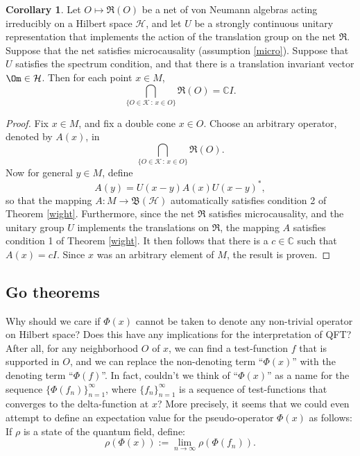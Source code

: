 \documentclass[11pt]{article}
\newcommand{\bh}{\mathfrak{B}(\mathcal{H})}
\theoremstyle{definition}
\newtheorem{cor}[thm]{Corollary}
\theoremstyle{definition}
\theoremstyle{remark}
\def\2#1{{\mathcal #1}}
\def\7#1{{\mathbb #1}}
\def\al#1{{\mathfrak #1}}
\begin{document}
\begin{cor} Let $O\mapsto \al R(O)$ be a net of von Neumann algebras acting
  irreducibly on a Hilbert space $\2H$, and let $U$ be a strongly continuous unitary
  representation that implements the action of the translation group on the net $\al
  R$.  Suppose that the net satisfies microcausality (assumption \ref{micro}).
  Suppose that $U$ satisfies the spectrum condition, and that there is a translation
  invariant vector $\Om\in \2H$.  Then for each point $x\in M$,
$$ \bigcap _{\{ O\in  \2K\,:\,x\in O \}}\al R(O) =\7C I .$$
\end{cor}

\begin{proof} Fix $x\in M$, and fix a double cone $x\in O$.  Choose an arbitrary
  operator, denoted by $A(x)$, in
$$ \bigcap _{\{ O\in  \2K\,:\,x\in O \}}\al R(O) .$$  Now for general
$y\in M$, define
$$ A(y) =U(x-y)A(x)U(x-y)^* ,$$
so that the mapping $A:M\to \bh$ automatically satisfies condition 2
of Theorem \ref{wight}.  Furthermore, since the net $\al R$ satisfies
microcausality, and the unitary group $U$ implements the translations
on $\al R$, the mapping $A$ satisfies condition 1 of Theorem
\ref{wight}.  It then follows that there is a $c\in \7C$ such that
$A(x)=cI$.  Since $x$ was an arbitrary element of $M$, the result is
proven.
\end{proof}

\subsection{Go theorems}

Why should we care if $\Phi (x)$ cannot be taken to denote any non-trivial operator
on Hilbert space?  Does this have any implications for the interpretation of QFT?
After all, for any neighborhood $O$ of $x$, we can find a test-function $f$ that is
supported in $O$, and we can replace the non-denoting term ``$\Phi (x)$'' with the
denoting term ``$\Phi (f)$''.  In fact, couldn't we think of ``$\Phi (x)$'' as a name
for the sequence $\{ \Phi (f_n ) \} _{n=1}^{\infty}$, where $\{ f_n
\}_{n=1}^{\infty}$ is a sequence of test-functions that converges to the
delta-function at $x$?  More precisely, it seems that we could even attempt to define
an expectation value for the pseudo-operator $\Phi (x)$ as follows: If $\rho$ is a
state of the quantum field, define:
\begin{equation} \rho (\Phi (x)):= \lim _{n\rightarrow \infty}\rho (\Phi (f_{n}))
  .\end{equation}
\end{document}
